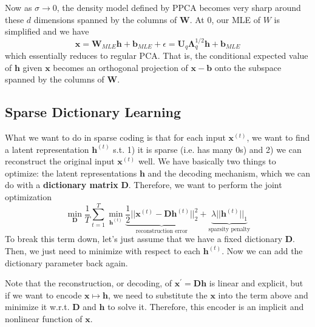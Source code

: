 \documentclass{article}
\begin{document}
    Now as $\sigma \rightarrow 0$, the density model defined by PPCA becomes very sharp around these $d$ dimensions spanned by the columns of $\mathbf{W}$. At $0$, our MLE of $W$ is simplified and we have 
    \[\mathbf{x} = \mathbf{W}_{MLE} \mathbf{h} + \mathbf{b}_{MLE} + \epsilon = \mathbf{U}_q \boldsymbol{\Lambda}_q^{1/2} \mathbf{h} + \mathbf{b}_{MLE} \]
    which essentially reduces to regular PCA. That is, the conditional expected value of $\mathbf{h}$ given $\mathbf{x}$ becomes an orthogonal projection of $\mathbf{x} - \mathbf{b}$ onto the subspace spanned by the columns of $\mathbf{W}$.  


  \subsection{Sparse Dictionary Learning}

    What we want to do in sparse coding is that for each input $\mathbf{x}^{(t)}$, we want to find a latent representation $\mathbf{h}^{(t)}$ s.t. 1) it is sparse (i.e. has many $0$s) and 2) we can reconstruct the original input $\mathbf{x}^{(t)}$ well. We have basically two things to optimize: the latent representations $\mathbf{h}$ and the decoding mechanism, which we can do with a \textbf{dictionary matrix} $\mathbf{D}$. Therefore, we want to perform the joint optimization
    \[\min_{\mathbf{D}} \frac{1}{T} \sum_{t=1}^T \min_{\mathbf{h}^{(t)}} \underbrace{\frac{1}{2} ||\mathbf{x}^{(t)} - \mathbf{D} \mathbf{h}^{(t)}||_2^2}_{\text{reconstruction error}} + \underbrace{\lambda ||\mathbf{h}^{(t)}||_1}_{\text{sparsity penalty}}\]
    To break this term down, let's just assume that we have a fixed dictionary $\mathbf{D}$. Then, we just need to minimize with respect to each $\mathbf{h}^{(t)}$. Now we can add the dictionary parameter back again. 

    Note that the reconstruction, or decoding, of $\mathbf{x}^\prime = \mathbf{D} \mathbf{h}$ is linear and explicit, but if we want to encode $\mathbf{x} \mapsto \mathbf{h}$, we need to substitute the $\mathbf{x}$ into the term above and minimize it w.r.t. $\mathbf{D}$ and $\mathbf{h}$ to solve it. Therefore, this encoder is an implicit and nonlinear function of $\mathbf{x}$. 
\end{document}
